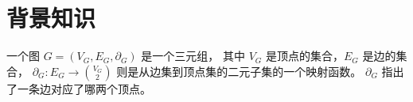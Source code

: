 
\chapter{背景知识}

一个图 $G = (V_G, E_G, \partial_G)$ 是一个三元组，
其中 $V_G$ 是顶点的集合，$E_G$ 是边的集合，
$\partial_G \colon E_G \rightarrow \binom{V_G}{2}$
则是从边集到顶点集的二元子集的一个映射函数。
$\partial_G$ 指出了一条边对应了哪两个顶点。


